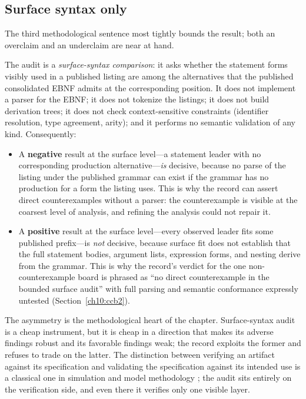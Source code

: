 \subsection{Surface syntax only}\label{ch10:method-surface}

The third methodological sentence most tightly bounds the result; both an overclaim and an underclaim are near at hand.

The audit is a \emph{surface-syntax comparison}: it asks whether the statement forms visibly used in a published listing are among the alternatives that the published consolidated EBNF admits at the corresponding position. It does not implement a parser for the EBNF; it does not tokenize the listings; it does not build derivation trees; it does not check context-sensitive constraints (identifier resolution, type agreement, arity); and it performs no semantic validation of any kind. Consequently:

\begin{itemize}
\item A \textbf{negative} result at the surface level---a statement leader with no corresponding production alternative---\emph{is} decisive, because no parse of the listing under the published grammar can exist if the grammar has no production for a form the listing uses. This is why the record can assert direct counterexamples without a parser: the counterexample is visible at the coarsest level of analysis, and refining the analysis could not repair it.
\item A \textbf{positive} result at the surface level---every observed leader fits some published prefix---is \emph{not} decisive, because surface fit does not establish that the full statement bodies, argument lists, expression forms, and nesting derive from the grammar. This is why the record's verdict for the one non-counterexample board is phrased as ``no direct counterexample in the bounded surface audit'' with full parsing and semantic conformance expressly untested (Section~\ref{ch10:ccb2}).
\end{itemize}

The asymmetry is the methodological heart of the chapter. Surface-syntax audit is a cheap instrument, but it is cheap in a direction that makes its adverse findings robust and its favorable findings weak; the record exploits the former and refuses to trade on the latter. The distinction between verifying an artifact against its specification and validating the specification against its intended use is a classical one in simulation and model methodology \cite{sargent}; the audit sits entirely on the verification side, and even there it verifies only one visible layer.


